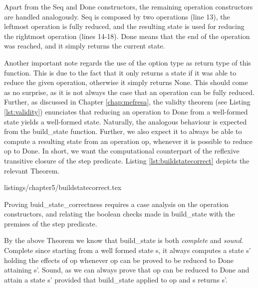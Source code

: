 	Apart from the
	\textsf{Seq} and \textsf{Done} constructors, the remaining \textsf{operation} 
	 constructors are handled analogously. \textsf{Seq} is composed by two \textsf{operations} (line 13),
	 the leftmost \textsf{operation} is fully reduced, and the resulting \textsf{state} is used
	 for reducing the rightmost \textsf{operation} (lines 14-18). \textsf{Done} means that the end of 
	 the \textsf{operation} was reached, and it simply returns the current \textsf{state}.
	 
	 
	 	Another important note regards the use of the \textsf{option} type as return type of this
	 function. This is due to the fact that it only returns a \textsf{state} if it was able to \textsf{reduce}
	 the given \textsf{operation}, otherwise it simply returns \textsf{None}.
	This should come as no surprise, as it is not always the case that an \textsf{operation}
	can be fully reduced. Further, as discussed in Chapter \ref{chap:mefresa},
	the \textsf{validty} theorem (see Listing \ref{lst:validity}) enunciates that reducing
	an \textsf{operation} to \textsf{Done} from a well-formed \textsf{state} yields a 
	well-formed \textsf{state}.	
	Naturally, the analogous behaviour is expected from the \textsf{build\_state} function. 	
	Further, we also expect it to  always be able  to compute a resulting \textsf{state} from an
	\textsf{operation op}, whenever it is possible to reduce \textsf{op} to \textsf{Done}.	
	In short, we want the computational counterpart of the
	reflexive transitive closure of the \textsf{step} predicate. Listing \ref{lst:buildstatecorrect}
	depicts the relevant Theorem.
	

   
                          {listings/chapter5/buildstatecorrect.tex}			


	\noindent Proving \textsf{buid\_state\_correctness} requires a case analysis on the \textsf{operation}
	constructors, and relating the boolean checks made in \textsf{build\_state}	
	with the premises of  the \textsf{step} predicate.	
	
		By the above Theorem we know that \textsf{build\_state} is both 
	\textit{complete} and \textit{sound}. Complete since 
	starting from a \textsf{well formed} 
	state \textsf{s}, it always computes a state \textsf{s'} holding the effects of \textsf{op} 
	whenever \textsf{op} can be proved to be reduced to \textsf{Done} attaining \textsf{s'}.
	Sound, as we can always prove that
	\textsf{op}  can be reduced to \textsf{Done} and attain a state \textsf{s'} provided that
	 \textsf{build\_state} applied to \textsf{op} and \textsf{s} returns \textsf{s'}.

